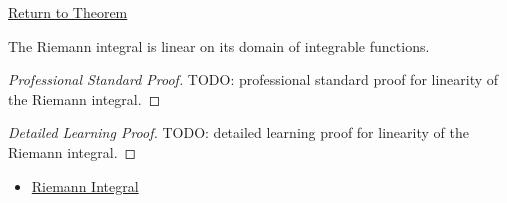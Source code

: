 \newpage
{}
\label{prf:riemann-integral-linearity}

\begin{remark*}[Return]
\hyperref[thm:riemann-integral-linearity]{Return to Theorem}
\end{remark*}

\begin{theorem*}
The Riemann integral is linear on its domain of integrable functions.
\end{theorem*}

\begin{proof}[Professional Standard Proof]
\LRAProofBodyStart
TODO: professional standard proof for linearity of the Riemann integral.
\end{proof}

\begin{proof}[Detailed Learning Proof]
\LRAProofBodyStart
TODO: detailed learning proof for linearity of the Riemann integral.
\end{proof}

\begin{remark*}
\end{remark*}

\begin{dependencies}
\begin{itemize}
  \item \hyperref[def:riemann-integral]{Riemann Integral}
\end{itemize}
\end{dependencies}

\clearpage
